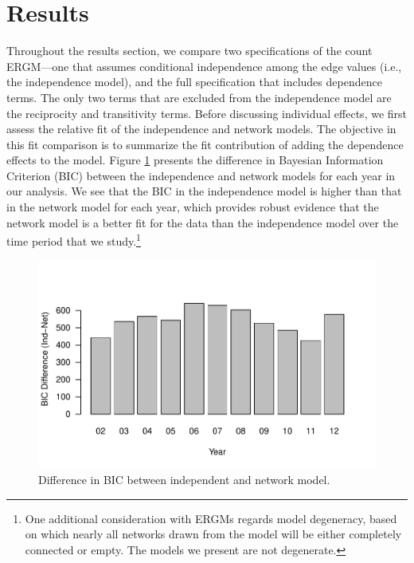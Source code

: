 \documentclass[reqno,onecolumn,letterpaper,12pt]{article}
\begin{document}
\section{Results}

Throughout the results section, we compare two specifications of the count ERGM---one that assumes conditional independence among the edge values (i.e., the independence model), and the full specification that includes dependence terms. The only two terms that are excluded from the independence model are the reciprocity and transitivity terms. Before discussing individual effects, we first assess the relative fit of the independence and network models. The objective in this fit comparison is to summarize the fit contribution of adding the dependence effects to the model. Figure \ref{fig:bic} presents the difference in Bayesian Information Criterion (BIC) between the independence and network models for each year in our analysis. We see that the BIC in the independence model is higher than that in the network model for each year, which provides robust evidence that the network model is a better fit for the data than the independence model over the time period that we study.\footnote{One additional consideration with ERGMs regards model degeneracy, based on which nearly all networks drawn from the model will be either completely connected or empty. The models we present are not degenerate.}


\begin{figure}[!h]
\centering
\includegraphics[scale=.75]{figures/BICdiff.pdf} \vspace{-.5cm}
\caption{\label{fig:bic} Difference in BIC between independent and network model.}
\end{figure}
\end{document}

